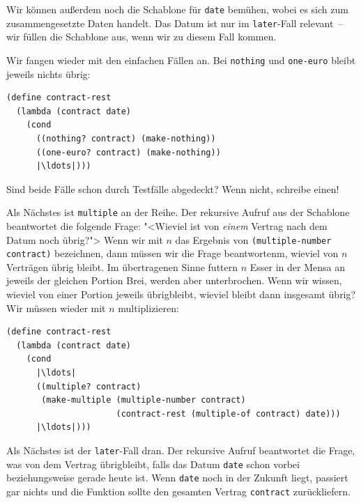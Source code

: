 %
Wir können außerdem noch die Schablone für \lstinline{date} bemühen,
wobei es sich zum zusammengesetzte Daten handelt.  Das Datum ist nur
im \lstinline{later}-Fall relevant~-- wir füllen die Schablone aus,
wenn wir zu diesem Fall kommen.

Wir fangen wieder mit den einfachen Fällen an.  Bei
\lstinline{nothing} und \lstinline{one-euro} bleibt jeweils nichts
übrig:
%
\begin{lstlisting}
(define contract-rest
  (lambda (contract date)
    (cond
      ((nothing? contract) (make-nothing))
      ((one-euro? contract) (make-nothing))
      |\ldots|)))
\end{lstlisting}
%
\begin{aufgabeinline}
  Sind beide Fälle schon durch Testfälle abgedeckt?  Wenn nicht,
  schreibe einen!
\end{aufgabeinline}
%
Als Nächstes ist \lstinline{multiple} an der Reihe.  Der rekursive
Aufruf aus der Schablone beantwortet die folgende Frage: "<Wieviel ist
von \emph{einem} Vertrag nach dem Datum noch übrig?"> Wenn wir mit $n$
das Ergebnis von \lstinline{(multiple-number contract)} bezeichnen,
dann müssen wir die Frage beantwortenm, wieviel von $n$
Verträgen übrig bleibt.  Im übertragenen Sinne futtern $n$ Esser in
der Mensa an jeweils der gleichen Portion Brei, werden aber
unterbrochen. Wenn wir wissen, wieviel von einer Portion jeweils übrigbleibt,
wieviel bleibt dann insgesamt übrig?  Wir müssen wieder mit $n$
multiplizieren:
%
\begin{lstlisting}
(define contract-rest
  (lambda (contract date)
    (cond
      |\ldots|
      ((multiple? contract)
       (make-multiple (multiple-number contract)
                      (contract-rest (multiple-of contract) date)))
      |\ldots|)))
\end{lstlisting}
%
Als Nächstes ist der \lstinline{later}-Fall dran.  Der rekursive
Aufruf beantwortet die Frage, was von dem Vertrag übrigbleibt, falls
das Datum \lstinline{date} schon vorbei beziehungsweise gerade heute
ist.  Wenn \lstinline{date} noch in der Zukunft liegt, passiert gar
nichts und die Funktion sollte den gesamten Vertrag
\lstinline{contract} zurückliefern.

